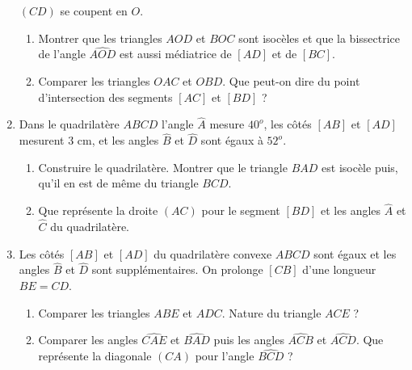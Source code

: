 \documentclass[12 pt]{report}
\theoremstyle{plain}
\newcounter{n}
\begin{document}
\begin{enumerate}
$(CD)$ se coupent en $O$. 
\begin{enumerate}
\item Montrer que les triangles $AOD$ et $BOC$ sont isocèles et que la bissectrice de l'angle $\widehat{AOD}$ est aussi médiatrice de $[AD]$ et de $[BC]$.
\item Comparer les triangles $OAC$ et $OBD$. Que peut-on dire du point d'intersection
des segments $[AC]$ et $[BD]$ ? 
\end{enumerate}
\item Dans le quadrilatère $ABCD$ l'angle $\widehat{A}$ mesure $40^o$, les côtés $[AB]$ et $[AD]$ mesurent $3$ cm, et les angles $\widehat{B}$ et $\widehat{D}$ sont égaux à $52^o$. \begin{enumerate}
\item Construire le quadrilatère. Montrer que le triangle $BAD$ est isocèle puis, qu'il en est de même du triangle $BCD$.
\item Que représente la droite $(AC)$ pour le segment $[BD]$ et les angles $\widehat{A}$ et $\widehat{C}$ du quadrilatère. 
\end{enumerate}
\item Les côtés $[AB]$ et $[AD]$ du quadrilatère convexe $ABCD$ sont égaux et les angles $\widehat{B}$ et $\widehat{D}$ sont supplémentaires. On prolonge $[CB]$ d'une
longueur $BE=CD$. \begin{enumerate}
\item Comparer les triangles $ABE$ et $ADC$. Nature du triangle $ACE$ ? 
\item Comparer les angles $\widehat{CAE}$ et $\widehat{BAD}$ puis les angles $\widehat{ACB}$ et $\widehat{ACD}$. Que représente la diagonale $(CA)$ pour l'angle 
$\widehat{BCD}$ ? 
\end{enumerate}
\end{enumerate}
\end{document}
